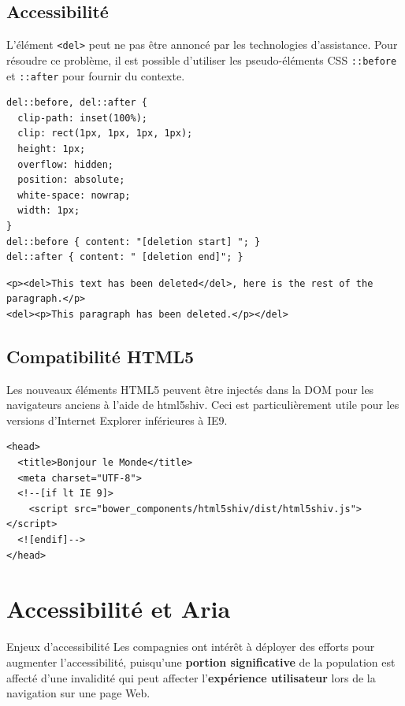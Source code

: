 \documentclass{report}
\begin{document}
\begin{multicols*}{2}
\section{Accessibilité}

\noindent
L'élément \texttt{<del>} peut ne pas être annoncé par les technologies d'assistance. Pour résoudre ce problème, il est possible d'utiliser les pseudo-éléments CSS \texttt{::before} et \texttt{::after} pour fournir du contexte.

\begin{lstlisting}[style=HTMLDraculaDark]
del::before, del::after {
  clip-path: inset(100%);
  clip: rect(1px, 1px, 1px, 1px);
  height: 1px;
  overflow: hidden;
  position: absolute;
  white-space: nowrap;
  width: 1px;
}
del::before { content: "[deletion start] "; }
del::after { content: " [deletion end]"; }
\end{lstlisting}

\begin{lstlisting}[style=HTMLDraculaDark]
<p><del>This text has been deleted</del>, here is the rest of the paragraph.</p>
<del><p>This paragraph has been deleted.</p></del>
\end{lstlisting}


\section{Compatibilité HTML5}

\noindent
Les nouveaux éléments HTML5 peuvent être injectés dans la DOM pour les navigateurs anciens à l'aide de html5shiv. Ceci est particulièrement utile pour les versions d'Internet Explorer inférieures à IE9.

\begin{lstlisting}[style=HTMLDraculaDark]
<head>
  <title>Bonjour le Monde</title>
  <meta charset="UTF-8">
  <!--[if lt IE 9]>
    <script src="bower_components/html5shiv/dist/html5shiv.js"></script>
  <![endif]-->
</head>
\end{lstlisting}


\chapter{Accessibilité et Aria}
\begin{Concept}{Enjeux d'accessibilité}{}
    Les compagnies ont intérêt à déployer des efforts pour augmenter l'accessibilité, puisqu'une 
    \textbf{portion significative} de la population est affecté d'une invalidité qui 
    peut affecter l'\textbf{expérience utilisateur} lors de la navigation sur une page Web.   
\end{Concept}


\end{multicols*}
\end{document}
